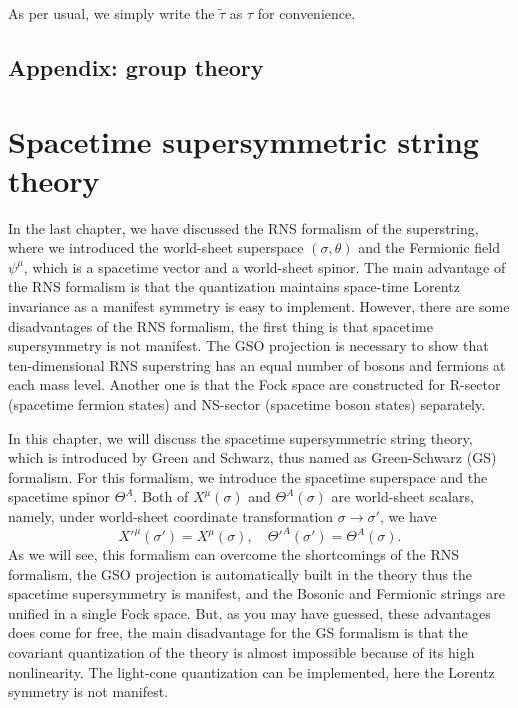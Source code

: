 \documentclass[graybox,envcountchap,sectrefs]{svmono}
\begin{document}
 As per usual, we simply write the $\tilde{\tau}$ as $\tau$ for convenience. 


\section{Appendix: group theory}




\chapter{Spacetime supersymmetric string theory}

In the last chapter, we have discussed the RNS formalism of the superstring, where we introduced the world-sheet superspace $(\sigma,\theta)$ and the
 Fermionic field $\psi^{\mu}$, which is a spacetime vector and a world-sheet spinor. The main advantage of the RNS formalism is that the quantization maintains space-time Lorentz invariance as a manifest symmetry is easy to implement.
However, there are some disadvantages of the RNS formalism, the first thing is that spacetime supersymmetry is not manifest. The GSO projection is necessary to show that ten-dimensional RNS superstring has an equal number of bosons and fermions at each mass level.
Another one is that the Fock space are constructed for R-sector (spacetime fermion states) and NS-sector (spacetime boson states) separately.


In this chapter, we will discuss the spacetime supersymmetric string theory, which is introduced by Green and Schwarz, thus named as Green-Schwarz (GS) formalism.
For this formalism, we introduce the spacetime superspace and the spacetime spinor $\Theta^A$. Both of $X^{\mu}(\sigma)$ and $\Theta^A(\sigma)$ are world-sheet scalars, namely, under world-sheet coordinate transformation $\sigma\to \sigma'$, we have
\begin{equation}
X'^{\mu}(\sigma')=X^{\mu}(\sigma),\quad \Theta'^{A}(\sigma')=\Theta^A(\sigma).	
\end{equation}
As we will see, this formalism can overcome the shortcomings of the RNS formalism, the GSO projection is automatically built in the theory thus the spacetime supersymmetry is manifest, and the Bosonic and Fermionic strings are unified in a single Fock space. But, as you may have guessed, these advantages does come for free, the main disadvantage for the GS formalism is that the covariant quantization of the theory is almost impossible because of its high nonlinearity. The light-cone quantization can be implemented, here the Lorentz symmetry is not manifest.
\end{document}
